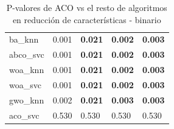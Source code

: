 \begin{table}[htp]
\begin{tabular}{lllll}
        ba\_knn    & 0.001     & \textbf{0.021} & \textbf{0.002} & \textbf{0.003} \\
        abco\_svc  & 0.001     & \textbf{0.021} & \textbf{0.002} & \textbf{0.003} \\
        woa\_knn   & 0.001     & \textbf{0.021} & \textbf{0.002} & \textbf{0.003} \\
        woa\_svc   & 0.001     & \textbf{0.021} & \textbf{0.002} & \textbf{0.003} \\
        gwo\_knn   & 0.002     & \textbf{0.021} & \textbf{0.003} & \textbf{0.003} \\
        aco\_svc   & 0.530     & 0.530          & 0.530          & 0.530          \\
        \bottomrule
    \end{tabular}
    \caption{P-valores de ACO vs el resto de algoritmos en reducción de características - binario}
    \label{tab:p-values_aco_rest}
\end{table}


